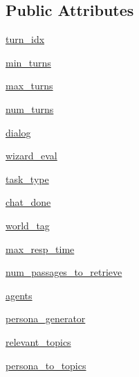 \subsection*{Public Attributes}
\begin{DoxyCompactItemize}
\item 
\hyperlink{classworlds_1_1MTurkWizardOfWikipediaWorld_a90311faeec02a535455cdb10f0d44c42}{turn\+\_\+idx}
\item 
\hyperlink{classworlds_1_1MTurkWizardOfWikipediaWorld_abe496f15c0cb0373742d9b9c8c4217ef}{min\+\_\+turns}
\item 
\hyperlink{classworlds_1_1MTurkWizardOfWikipediaWorld_a91af484c279c33ecd9fe06b6607ca3cc}{max\+\_\+turns}
\item 
\hyperlink{classworlds_1_1MTurkWizardOfWikipediaWorld_a7828d2c2042815cabe29567692445722}{num\+\_\+turns}
\item 
\hyperlink{classworlds_1_1MTurkWizardOfWikipediaWorld_aa55109e65852986463c3071b9e9a20cd}{dialog}
\item 
\hyperlink{classworlds_1_1MTurkWizardOfWikipediaWorld_a2c90da28eb6f1188fd43e926cf82fff9}{wizard\+\_\+eval}
\item 
\hyperlink{classworlds_1_1MTurkWizardOfWikipediaWorld_ac55cb6fd6e8840148b7c70edfa015583}{task\+\_\+type}
\item 
\hyperlink{classworlds_1_1MTurkWizardOfWikipediaWorld_a26a4b1f918aa527483fdaabac78d9743}{chat\+\_\+done}
\item 
\hyperlink{classworlds_1_1MTurkWizardOfWikipediaWorld_a285ebfae1d64f9535e4142dba8069fa2}{world\+\_\+tag}
\item 
\hyperlink{classworlds_1_1MTurkWizardOfWikipediaWorld_ad928e9dd4376aaf16afc88cea85efe80}{max\+\_\+resp\+\_\+time}
\item 
\hyperlink{classworlds_1_1MTurkWizardOfWikipediaWorld_a8ad448b7a12e18a8248fc6d782fa0e21}{num\+\_\+passages\+\_\+to\+\_\+retrieve}
\item 
\hyperlink{classworlds_1_1MTurkWizardOfWikipediaWorld_ad379b376ca949228453ed6340b93da89}{agents}
\item 
\hyperlink{classworlds_1_1MTurkWizardOfWikipediaWorld_a99e35bc2ef6531ebe9c8eeba4db094cd}{persona\+\_\+generator}
\item 
\hyperlink{classworlds_1_1MTurkWizardOfWikipediaWorld_a22db3e8a2dee11cdb898f10bd7aed0ea}{relevant\+\_\+topics}
\item 
\hyperlink{classworlds_1_1MTurkWizardOfWikipediaWorld_ad9e31c4e57313210c092569178a68db5}{persona\+\_\+to\+\_\+topics}
\item 

\end{DoxyCompactItemize}
